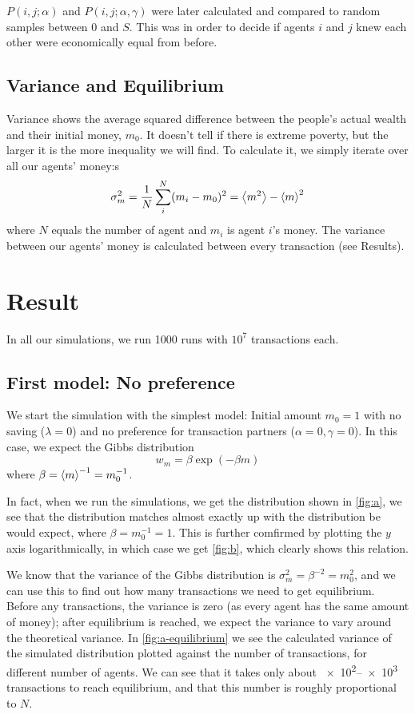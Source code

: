 \documentclass[12pt,a4paper]{article}
\begin{document}
$P(i,j;\alpha)$ and $P(i,j;\alpha,\gamma)$ were later calculated and compared to random samples between $0$ and $S$. This was in order to decide if agents $i$ and $j$ knew each other were economically equal from before.
\subsection{Variance and Equilibrium}
Variance shows the average squared difference between the people's actual wealth and their initial money, $m_0$. It doesn't tell if there is extreme poverty, but the larger it is the more inequality we will find.
To calculate it, we simply iterate over all our agents' money:s
\begin{equation}
\sigma_m^2 = \frac{1}{N}\sum_i^{N} (m_i - m_0)^2 = \expval{m^2} - \expval{m}^2 \label{eq:sigma}
\end{equation}
where $N$ equals the number of agent and $m_i$ is agent $i$'s money.
The variance between our agents' money is calculated between every transaction (see Results).

\clearpage

\section{Result}

In all our simulations, we run 1000 runs with $10^7$ transactions each.

\subsection{First model: No preference}

We start the simulation with the simplest model: Initial amount $m_0 = 1$ with no saving ($\lambda = 0$) and no preference for transaction partners ($\alpha = 0, \gamma = 0$). In this case, we expect the Gibbs distribution
\begin{equation}
  w_m = \beta \exp(-\beta m)
\end{equation}
where $\beta = \expval{m}^{-1} = m_0^{-1}$.

In fact, when we run the simulations, we get the distribution shown in \cref{fig:a}, we see that the distribution matches almost exactly up with the distribution be would expect, where $\beta = m_0^{-1} = 1$. This is further comfirmed by plotting the $y$ axis logarithmically, in which case we get \cref{fig:b}, which clearly shows this relation.

We know that the variance of the Gibbs distribution is $\sigma_m^2 = \beta^{-2} = m_0^2$, and we can use this to find out how many transactions we need to get equilibrium. Before any transactions, the variance is zero (as every agent has the same amount of money); after equilibrium is reached, we expect the variance to vary around the theoretical variance.
In \cref{fig:a-equilibrium} we see the calculated variance of the simulated distribution plotted against the number of transactions, for different number of agents. We can see that it takes only about \numrange{e2}{e3} transactions to reach equilibrium, and that this number is roughly proportional to $N$.
\end{document}
